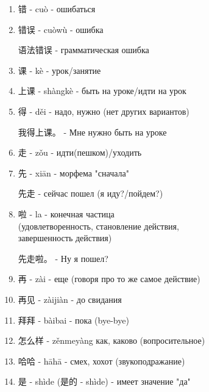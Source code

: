 \begin{newwords}\hfill
	\begin{enumerate}
		\item 错 - cuò - ошибаться
		\item 错误 - cuòwù - ошибка
		\begin{example}
			语法错误 - грамматическая ошибка
		\end{example}
		\item 课 - kè - урок/занятие
		\item 上课 - shàngkè - быть на уроке/идти на урок
		\item 得 - děi - надо, нужно (нет других вариантов)
		\begin{example}
			我得上课。 - Мне нужно быть на уроке
		\end{example}
		\item 走 - zǒu - идти(пешком)/уходить
		\item 先 - xiān - морфема "сначала"
		\begin{example}
			先走 - сейчас пошел (я иду?/пойдем?)
		\end{example}
		\item 啦 - la - конечная частица\\
		(удовлетворенность, становление действия,\\ завершенность действия)
		\begin{example}
			先走啦。 - Ну я пошел?
		\end{example}
		\item 再 - zài - еще (говоря про то же самое действие)
		\item 再见 - zàijiàn  - до свидания
		\item 拜拜 - bàibai - пока (bye-bye)
		\item 怎么样 - zěnmeyàng как, каково (вопросительное)
		\item 哈哈 - hāhā - смех, хохот (звукоподражание)
		\item 是 - shìde (是的 - shìde) - имеет значение "да"
	\end{enumerate}
\end{newwords}